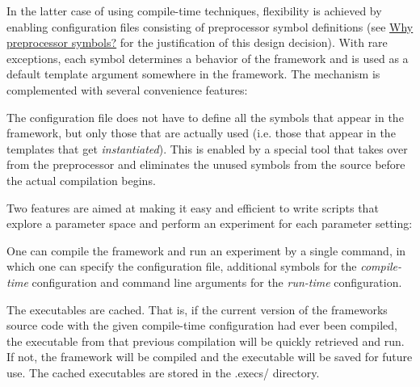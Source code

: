 In the latter case of using compile-\/time techniques, flexibility is achieved by enabling configuration files consisting of preprocessor symbol definitions (see \hyperlink{index_s-why-symbols}{Why preprocessor symbols?} for the justification of this design decision). With rare exceptions, each symbol determines a behavior of the framework and is used as a default template argument somewhere in the framework. The mechanism is complemented with several convenience features\+:


\begin{DoxyItemize}
\item The configuration file does not have to define all the symbols that appear in the framework, but only those that are actually used (i.\+e. those that appear in the templates that get {\itshape instantiated}). This is enabled by a special tool that takes over from the preprocessor and eliminates the unused symbols from the source before the actual compilation begins.
\item Two features are aimed at making it easy and efficient to write scripts that explore a parameter space and perform an experiment for each parameter setting\+:
\begin{DoxyItemize}
\item One can compile the framework and run an experiment by a single command, in which one can specify the configuration file, additional symbols for the {\itshape compile-\/time} configuration and command line arguments for the {\itshape run-\/time} configuration.
\item The executables are cached. That is, if the current version of the framework\textquotesingle{}s source code with the given compile-\/time configuration had ever been compiled, the executable from that previous compilation will be quickly retrieved and run. If not, the framework will be compiled and the executable will be saved for future use. The cached executables are stored in the {\ttfamily .execs/} directory.
\end{DoxyItemize}
\end{DoxyItemize}

